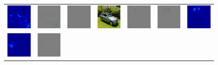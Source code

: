 \begin{figure}
\begin{center}
\begin{tabular}{ccccccc}
\includegraphics[width=0.13\linewidth]{figs/examples/googlenet/soft/bic-car2_sali_818} &
\includegraphics[width=0.13\linewidth]{figs/examples/googlenet/soft/bic-car2_diff_818} &
\includegraphics[width=0.13\linewidth]{figs/examples/googlenet/oxford/bic-car2_diff_818} &
\includegraphics[width=0.13\linewidth]{figs/examples/googlenet/oxford/bic-car2} &
\includegraphics[width=0.13\linewidth]{figs/examples/googlenet/oxford/bic-car2_diff_672} &
\includegraphics[width=0.13\linewidth]{figs/examples/googlenet/soft/bic-car2_diff_672} &
\includegraphics[width=0.13\linewidth]{figs/examples/googlenet/soft/bic-car2_sali_672} \\
\includegraphics[width=0.13\linewidth]{figs/examples/googlenet/soft/zeb-ele1_sali_341} &
\includegraphics[width=0.13\linewidth]{figs/examples/googlenet/soft/zeb-ele1_diff_341} &

\end{tabular}
\end{center}
\end{figure}
